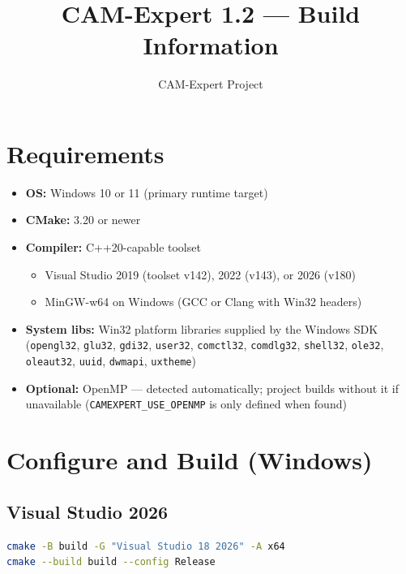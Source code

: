 \documentclass[11pt,a4paper]{article}
\title{\textbf{CAM-Expert 1.2 --- Build Information}}
\author{CAM-Expert Project}
\date{}
\begin{document}
\maketitle
\tableofcontents
\newpage

\section{Requirements}

\begin{itemize}
  \item \textbf{OS:} Windows 10 or 11 (primary runtime target)
  \item \textbf{CMake:} 3.20 or newer
  \item \textbf{Compiler:} C++20-capable toolset
    \begin{itemize}
      \item Visual Studio 2019 (toolset v142), 2022 (v143), or 2026 (v180)
      \item MinGW-w64 on Windows (GCC or Clang with Win32 headers)
    \end{itemize}
  \item \textbf{System libs:} Win32 platform libraries supplied by the Windows SDK
    (\texttt{opengl32}, \texttt{glu32}, \texttt{gdi32}, \texttt{user32},
     \texttt{comctl32}, \texttt{comdlg32}, \texttt{shell32}, \texttt{ole32},
     \texttt{oleaut32}, \texttt{uuid}, \texttt{dwmapi}, \texttt{uxtheme})
  \item \textbf{Optional:} OpenMP --- detected automatically; project builds without it
    if unavailable (\texttt{CAMEXPERT\_USE\_OPENMP} is only defined when found)
\end{itemize}

\section{Configure and Build (Windows)}

\subsection{Visual Studio 2026}
\begin{lstlisting}[language=bash]
cmake -B build -G "Visual Studio 18 2026" -A x64
cmake --build build --config Release
\end{lstlisting}
\end{document}
